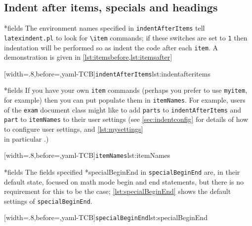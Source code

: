 \subsection{Indent after items, specials and headings}
*{fields}
 The environment names specified in \texttt{indentAfterItems} tell
 \texttt{latexindent.pl} to look for \lstinline!\item! commands; if these switches are
 set to \texttt{1} then indentation will be performed so as indent the code after each
 \texttt{item}. A demonstration is given in \cref{lst:itemsbefore,lst:itemsafter}

 \begin{cmhtcbraster}[raster columns=3,
   raster left skip=-3.5cm,
   raster right skip=-2cm,
   raster column skip=.03\linewidth]
  [width=.8\linewidth,before=\centering,yaml-TCB]{\texttt{indentAfterItems}}{lst:indentafteritems}
 \end{cmhtcbraster}

*{fields}
 If you have your own \texttt{item} commands (perhaps you prefer to use \texttt{myitem},
 for example) then you can put populate them in \texttt{itemNames}. For example, users of
 the \texttt{exam} document class might like to add \texttt{parts} to
 \texttt{indentAfterItems} and \texttt{part} to \texttt{itemNames} to their user settings
 (see \vref{sec:indentconfig} for details of how to configure user settings, and
 \vref{lst:mysettings} \\ in particular \label{page:examsettings}.)

 [width=.8\linewidth,before=\centering,yaml-TCB]{\texttt{itemNames}}{lst:itemNames}

*{fields}\label{yaml:specialBeginEnd}
 The fields specified 
 *{specialBeginEnd} in \texttt{specialBeginEnd} are, in their
 default state, focused on math mode begin and end statements, but there is no
 requirement for this to be the case; \cref{lst:specialBeginEnd} shows the default
 settings of \texttt{specialBeginEnd}. %

 [width=.8\linewidth,before=\centering,yaml-TCB]{\texttt{specialBeginEnd}}{lst:specialBeginEnd}

